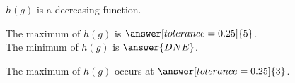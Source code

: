 \documentclass{ximera}
\begin{document}
\begin{exercise}
\begin{question}
$h(g)$ is a decreasing function.
\begin{multipleChoice}
\end{multipleChoice}

\end{question}









\begin{question} 



The maximum of $h(g)$ is $\answer[tolerance=0.25]{5}$.   \\

The minimum of $h(g)$ is $\answer{DNE}$.
 

\end{question}






\begin{question} 


The maximum of $h(g)$ occurs at $\answer[tolerance=0.25]{3}$.   

\end{question}









\end{exercise}
\end{document}
